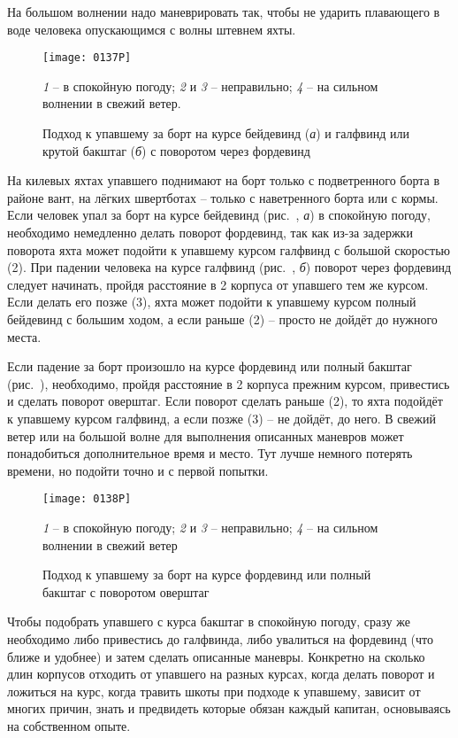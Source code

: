 На большом волнении надо маневрировать так, чтобы не ударить плавающего в воде человека опускающимся с волны штевнем яхты.

\begin{figure*}[htb]
  \centering{}
  \texttt{[image: 0137P]}
  \caption{Подход к упавшему за борт на курсе бейдевинд (\textit{а}) и галфвинд или крутой бакштаг (\textit{б}) с поворотом через фордевинд}
  \label{fig:137}
  \small
  \centering{}
  \textit{1} \--- в спокойную погоду; \textit{2} и \textit{3} \--- неправильно; \textit{4} \--- на сильном волнении в свежий ветер.
\end{figure*}

На килевых яхтах упавшего поднимают на борт только с подветренного борта в районе вант, на лёгких швертботах \--- только с наветренного борта или с кормы. Если человек упал за борт на курсе бейдевинд (рис.~, \textit{а}) в спокойную погоду, необходимо немедленно делать поворот фордевинд, так как из-за задержки поворота яхта может подойти к упавшему курсом галфвинд с большой скоростью (2). При падении человека на курсе галфвинд (рис.~, \textit{б}) поворот через фордевинд следует начинать, пройдя расстояние в 2 корпуса от упавшего тем же курсом. Если делать его позже (3), яхта может подойти к упавшему курсом полный бейдевинд с большим ходом, а если раньше (2) \--- просто не дойдёт до нужного места.

Если падение за борт произошло на курсе фордевинд или полный бакштаг (рис.~), необходимо, пройдя расстояние в 2 корпуса прежним курсом, привестись и сделать поворот оверштаг. Если поворот сделать раньше (2), то яхта подойдёт к упавшему курсом галфвинд, а если позже (3) \--- не дойдёт, до него. В свежий ветер или на большой волне для выполнения описанных маневров может понадобиться дополнительное время и место. Тут лучше немного потерять времени, но подойти точно и с первой попытки.

\begin{figure}[htb]
  \centering{}
  \texttt{[image: 0138P]}
  \caption{Подход к упавшему за борт на курсе фордевинд или полный бакштаг с поворотом оверштаг}
  \label{fig:138}
  \small
  \centering{}
  \textit{1} \--- в спокойную погоду; \textit{2} и \textit{3} \--- неправильно; \textit{4} \--- на сильном волнении в свежий ветер
\end{figure}

Чтобы подобрать упавшего с курса бакштаг в спокойную погоду, сразу же необходимо либо привестись до галфвинда, либо увалиться на фордевинд (что ближе и удобнее) и затем сделать описанные маневры. Конкретно на сколько длин корпусов отходить от упавшего на разных курсах, когда делать поворот и ложиться на курс, когда травить шкоты при подходе к упавшему, зависит от многих причин, знать и предвидеть которые обязан каждый капитан, основываясь на собственном опыте. 

